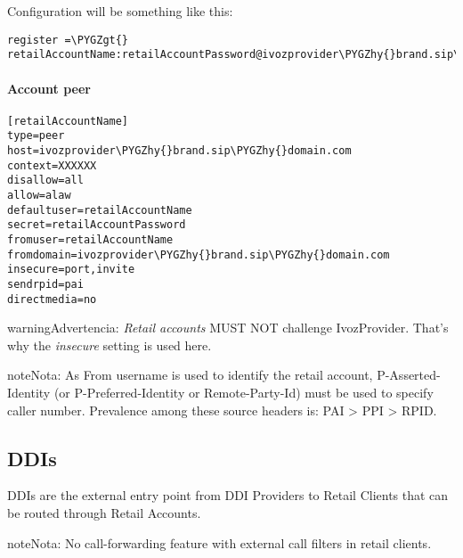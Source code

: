 \documentclass[letterpaper,10pt,spanish]{sphinxmanual}
\def\PYGZgt{\char`\>}
\def\PYGZhy{\char`\-}
\begin{document}
Configuration will be something like this:

\begin{Verbatim}[commandchars=\\\{\}]
register =\PYGZgt{} retailAccountName:retailAccountPassword@ivozprovider\PYGZhy{}brand.sip\PYGZhy{}domain.com
\end{Verbatim}


\paragraph{Account peer}
\label{administration_portal/client/retail/retail_accounts:account-peer}
\begin{Verbatim}[commandchars=\\\{\}]
[retailAccountName]
type=peer
host=ivozprovider\PYGZhy{}brand.sip\PYGZhy{}domain.com
context=XXXXXX
disallow=all
allow=alaw
defaultuser=retailAccountName
secret=retailAccountPassword
fromuser=retailAccountName
fromdomain=ivozprovider\PYGZhy{}brand.sip\PYGZhy{}domain.com
insecure=port,invite
sendrpid=pai
directmedia=no
\end{Verbatim}

\begin{notice}{warning}{Advertencia:}
\emph{Retail accounts} MUST NOT challenge IvozProvider. That's
why the \emph{insecure} setting is used here.
\end{notice}

\begin{notice}{note}{Nota:}
As From username is used to identify the retail account, P-Asserted-Identity (or P-Preferred-Identity or Remote-Party-Id) must be used to specify caller number.
Prevalence among these source headers is: PAI \textgreater{} PPI \textgreater{} RPID.
\end{notice}


\subsection{DDIs}
\label{administration_portal/client/retail/ddis:ddis}\label{administration_portal/client/retail/ddis::doc}\label{administration_portal/client/retail/ddis:retail-ddis}
DDIs are the external entry point from DDI Providers to Retail Clients that
can be routed through Retail Accounts.

\begin{notice}{note}{Nota:}
No call-forwarding feature with external call filters in retail clients.
\end{notice}
\end{document}

